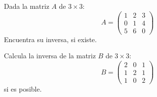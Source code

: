 \begin{exercise}
    Dada la matriz $A$ de $3 \times 3$:
\[
A = \begin{pmatrix} 
1 & 2 & 3 \\
0 & 1 & 4 \\
5 & 6 & 0 
\end{pmatrix}
\]
Encuentra su inversa, si existe.

\end{exercise}
\begin{exercise}
 Calcula la inversa de la matriz $B$ de $3 \times 3$:
\[
B = \begin{pmatrix} 
2 & 0 & 1 \\
1 & 2 & 1 \\
1 & 0 & 2 
\end{pmatrix}
\]
si es posible.
   
\end{exercise}
